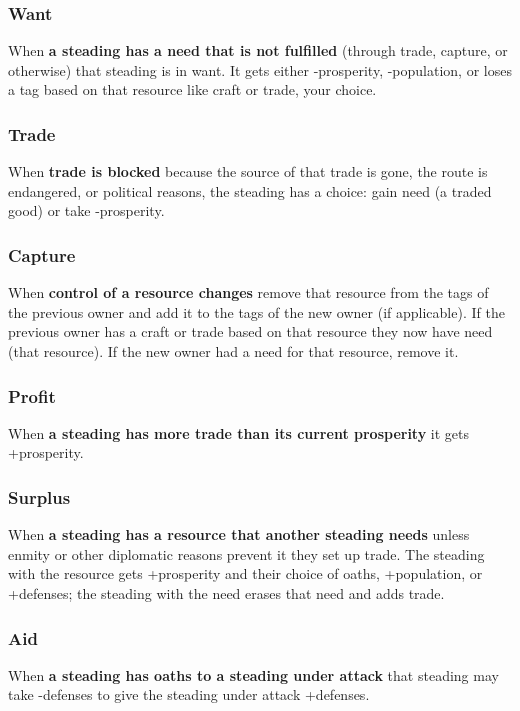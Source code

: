 \subsubsection{Want}


When \textbf{a steading has a need that is not fulfilled}
(through trade, capture, or otherwise) that steading is in want. It gets either -prosperity, -population, or loses a tag based on that resource like craft or trade, your choice.
\subsubsection{Trade}


When \textbf{trade is blocked}
because the source of that trade is gone, the route is endangered, or political reasons, the steading has a choice: gain need (a traded good) or take -prosperity.
\subsubsection{Capture}


When \textbf{control of a resource changes}
remove that resource from the tags of the previous owner and add it to the tags of the new owner (if applicable). If the previous owner has a craft or trade based on that resource they now have need (that resource). If the new owner had a need for that resource, remove it.
\subsubsection{Profit}


When \textbf{a steading has more trade than its current prosperity}
it gets +prosperity.
\subsubsection{Surplus}


When \textbf{a steading has a resource that another steading needs}
unless enmity or other diplomatic reasons prevent it they set up trade. The steading with the resource gets +prosperity and their choice of oaths, +population, or +defenses; the steading with the need erases that need and adds trade.
\subsubsection{Aid}


When \textbf{a steading has oaths to a steading under attack}
that steading may take -defenses to give the steading under attack +defenses.
